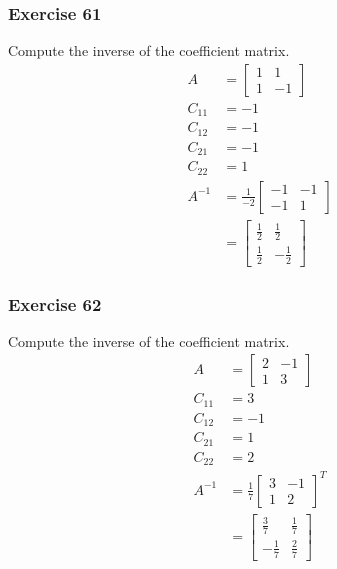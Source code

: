 \documentclass{math}
\begin{document}
\subsubsection*{Exercise 61}
Compute the inverse of the coefficient matrix.
\begin{align*}
  A &= \begin{bmatrix}1 & 1 \\ 1 & -1\end{bmatrix} \\
  C_{11} &= -1 \\
  C_{12} &= -1 \\
  C_{21} &= -1 \\
  C_{22} &= 1 \\
  A^{-1} &= \frac{1}{-2}\begin{bmatrix}-1 & -1 \\ -1 & 1\end{bmatrix} \\
  &= \begin{bmatrix}
    \frac{1}{2} & \frac{1}{2} \\[0.5em]
    \frac{1}{2} & -\frac{1}{2}
  \end{bmatrix}
\end{align*}

\subsubsection*{Exercise 62}
Compute the inverse of the coefficient matrix.
\begin{align*}
  A &= \begin{bmatrix}2 & -1 \\ 1 & 3\end{bmatrix} \\
  C_{11} &= 3 \\
  C_{12} &= -1 \\
  C_{21} &= 1 \\
  C_{22} &= 2 \\
  A^{-1} &= \frac{1}{7}\begin{bmatrix}3 & -1 \\ 1 & 2\end{bmatrix}^T \\
  &= \begin{bmatrix}
    \frac{3}{7} & \frac{1}{7} \\[0.5em]
    -\frac{1}{7} & \frac{2}{7}
  \end{bmatrix}
\end{align*}
\end{document}
